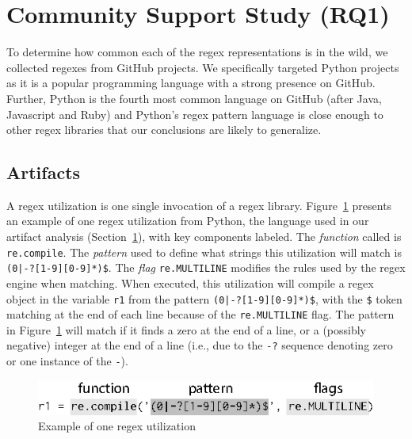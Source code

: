 
\section{Community Support Study (RQ1)}
\label{communitystudy}
To determine how common each of the regex representations is in the wild, we collected
regexes from GitHub projects. We specifically targeted Python projects as it is a popular programming language with a strong presence on GitHub. Further, Python is the fourth most common language on GitHub (after Java, Javascript and Ruby) and Python's regex pattern
language is close enough to other regex libraries that our conclusions are likely to generalize.



\subsection{Artifacts}
A regex {utilization} is one single invocation of a regex library.
Figure~\ref{fig:exampleUsage} presents an example of one regex {utilization} from Python, the language used in our artifact analysis (Section~\ref{communitystudy}), with key components labeled. The \emph{function} called is {\tt re.compile}.  The \emph{pattern} used to define what strings this utilization will match is \verb!(0|-?[1-9][0-9]*)$!.  The \emph{flag} {\tt re.MULTILINE} modifies the rules used by the regex engine when matching. When executed, this {utilization}  will compile a regex object in the variable {\tt r1} from the pattern \verb!(0|-?[1-9][0-9]*)$!, with the \verb!$! token matching at the end of each line because of the {\tt re.MULTILINE} flag.
  The pattern in Figure~\ref{fig:exampleUsage}  will match if it finds a zero at the end of a line, or a (possibly negative) integer at the end of a line (i.e., due to the {\tt -?} sequence denoting zero or one instance of the {\tt -}).

\begin{figure}[tb]
\centering
\includegraphics[width=\columnwidth]{illustrations/exampleUsage.eps}
\vspace{-12pt}
\caption{Example of one regex utilization}
\vspace{-6pt}
\label{fig:exampleUsage}
\end{figure}

